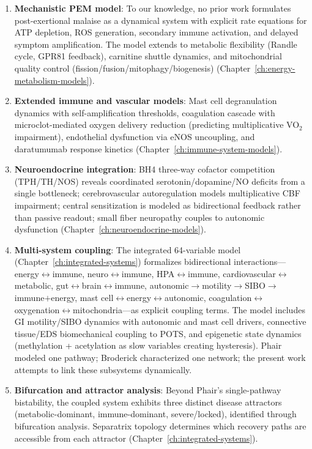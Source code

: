 \begin{enumerate}
    \item \textbf{Mechanistic PEM model}: To our knowledge, no prior work formulates post-exertional malaise as a dynamical system with explicit rate equations for ATP depletion, ROS generation, secondary immune activation, and delayed symptom amplification. The model extends to metabolic flexibility (Randle cycle, GPR81 feedback), carnitine shuttle dynamics, and mitochondrial quality control (fission/fusion/mitophagy/biogenesis) (Chapter~\ref{ch:energy-metabolism-models}).
    \item \textbf{Extended immune and vascular models}: Mast cell degranulation dynamics with self-amplification thresholds, coagulation cascade with microclot-mediated oxygen delivery reduction (predicting multiplicative VO$_2$ impairment), endothelial dysfunction via eNOS uncoupling, and daratumumab response kinetics (Chapter~\ref{ch:immune-system-models}).
    \item \textbf{Neuroendocrine integration}: BH4 three-way cofactor competition (TPH/TH/NOS) reveals coordinated serotonin/dopamine/NO deficits from a single bottleneck; cerebrovascular autoregulation models multiplicative CBF impairment; central sensitization is modeled as bidirectional feedback rather than passive readout; small fiber neuropathy couples to autonomic dysfunction (Chapter~\ref{ch:neuroendocrine-models}).
    \item \textbf{Multi-system coupling}: The integrated 64-variable model (Chapter~\ref{ch:integrated-systems}) formalizes bidirectional interactions---energy$\leftrightarrow$immune, neuro$\leftrightarrow$immune, HPA$\leftrightarrow$immune, cardiovascular$\leftrightarrow$metabolic, gut$\leftrightarrow$brain$\leftrightarrow$immune, autonomic$\to$motility$\to$SIBO$\to$immune$+$energy, mast cell$\leftrightarrow$energy$\leftrightarrow$autonomic, coagulation$\leftrightarrow$oxygenation$\leftrightarrow$mitochondria---as explicit coupling terms. The model includes GI motility/SIBO dynamics with autonomic and mast cell drivers, connective tissue/EDS biomechanical coupling to POTS, and epigenetic state dynamics (methylation + acetylation as slow variables creating hysteresis). Phair modeled one pathway; Broderick characterized one network; the present work attempts to link these subsystems dynamically.
    \item \textbf{Bifurcation and attractor analysis}: Beyond Phair's single-pathway bistability, the coupled system exhibits three distinct disease attractors (metabolic-dominant, immune-dominant, severe/locked), identified through bifurcation analysis. Separatrix topology determines which recovery paths are accessible from each attractor (Chapter~\ref{ch:integrated-systems}).

\end{enumerate}
